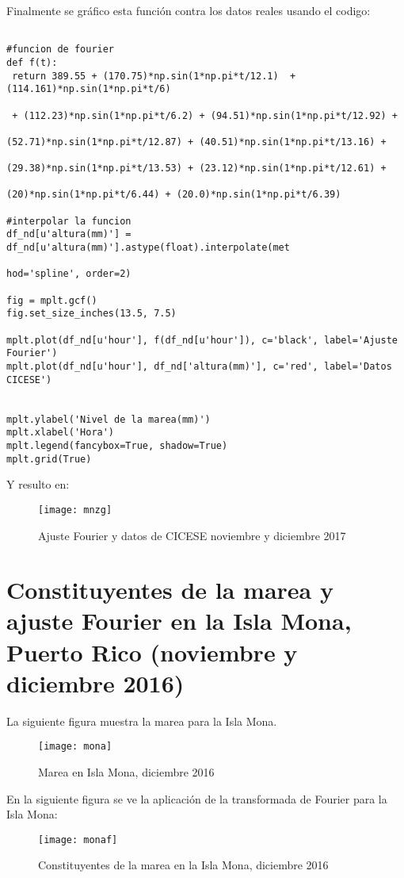 \documentclass[12pt,letterpaper]{article}
\begin{document}
Finalmente se gráfico esta función contra los datos reales usando el codigo:

\begin{verbatim}

#funcion de fourier
def f(t):
 return 389.55 + (170.75)*np.sin(1*np.pi*t/12.1)  + (114.161)*np.sin(1*np.pi*t/6) 
 
 + (112.23)*np.sin(1*np.pi*t/6.2) + (94.51)*np.sin(1*np.pi*t/12.92) +
 
(52.71)*np.sin(1*np.pi*t/12.87) + (40.51)*np.sin(1*np.pi*t/13.16) +

(29.38)*np.sin(1*np.pi*t/13.53) + (23.12)*np.sin(1*np.pi*t/12.61) +

(20)*np.sin(1*np.pi*t/6.44) + (20.0)*np.sin(1*np.pi*t/6.39)    

#interpolar la funcion
df_nd[u'altura(mm)'] = df_nd[u'altura(mm)'].astype(float).interpolate(met

hod='spline', order=2)

fig = mplt.gcf()
fig.set_size_inches(13.5, 7.5)

mplt.plot(df_nd[u'hour'], f(df_nd[u'hour']), c='black', label='Ajuste Fourier')
mplt.plot(df_nd[u'hour'], df_nd['altura(mm)'], c='red', label='Datos CICESE')


mplt.ylabel('Nivel de la marea(mm)')
mplt.xlabel('Hora')
mplt.legend(fancybox=True, shadow=True)
mplt.grid(True)
\end{verbatim}

Y resulto en:

\begin{figure}[H]
	\centering	\texttt{[image: mnzg]}
	\caption{Ajuste Fourier y datos de CICESE noviembre y diciembre 2017}
\end{figure}


\section{Constituyentes de la marea y ajuste Fourier en la Isla Mona, Puerto Rico (noviembre y diciembre 2016)}

La siguiente figura muestra la marea para la Isla Mona.
\begin{figure}[H]
	\centering	\texttt{[image: mona]}
	\caption{Marea en Isla Mona, diciembre 2016}
\end{figure}

En la siguiente figura se ve la aplicación de la transformada de Fourier para la Isla Mona:

\begin{figure}[H]
	\centering	\texttt{[image: monaf]}
	\caption{Constituyentes de la marea en la Isla Mona, diciembre 2016}
\end{figure}
\end{document}
